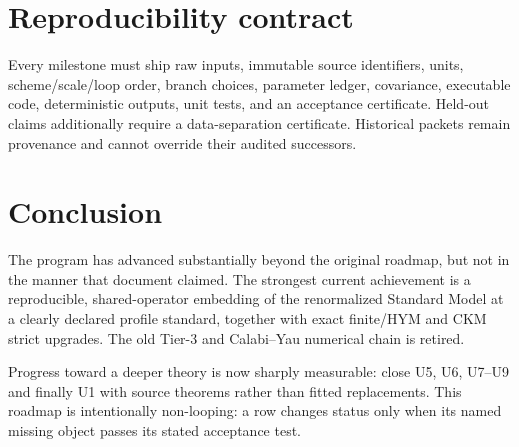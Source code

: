 \documentclass[11pt]{article}
\begin{document}
\section{Reproducibility contract}

Every milestone must ship raw inputs, immutable source identifiers, units,
scheme/scale/loop order, branch choices, parameter ledger, covariance,
executable code, deterministic outputs, unit tests, and an acceptance
certificate. Held-out claims additionally require a data-separation
certificate. Historical packets remain provenance and cannot override their
audited successors.

\section{Conclusion}

The program has advanced substantially beyond the original roadmap, but not in
the manner that document claimed. The strongest current achievement is a
reproducible, shared-operator embedding of the renormalized Standard Model at a
clearly declared profile standard, together with exact finite/HYM and CKM
strict upgrades. The old Tier-3 and Calabi--Yau numerical chain is retired.

Progress toward a deeper theory is now sharply measurable: close U5, U6,
U7--U9 and finally U1 with source theorems rather than fitted replacements.
This roadmap is intentionally non-looping: a row changes status only when its
named missing object passes its stated acceptance test.
\end{document}
